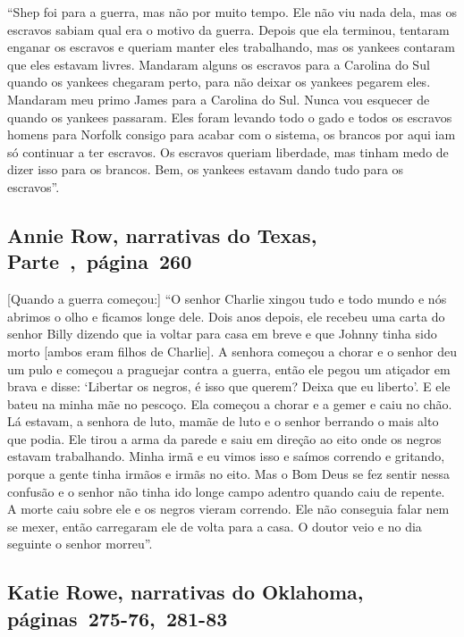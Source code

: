 ``Shep foi para a guerra, mas não por muito tempo. Ele não viu nada
dela, mas os escravos sabiam qual era o motivo da guerra. Depois que ela
terminou, tentaram enganar os escravos e queriam manter eles
trabalhando, mas os yankees contaram que eles estavam livres. Mandaram
alguns os escravos para a Carolina do Sul quando os yankees chegaram %
perto, para não deixar os yankees pegarem eles. Mandaram meu primo James
para a Carolina do Sul. Nunca vou esquecer de quando os yankees
passaram. Eles foram levando todo o gado e todos os escravos homens para
Norfolk consigo para acabar com o sistema, os brancos por aqui iam só
continuar a ter escravos. Os escravos queriam liberdade, mas tinham medo
de dizer isso para os brancos. Bem, os yankees estavam dando tudo para
os escravos''.

\subsection{Annie Row, narrativas do Texas, Parte~,~página~260}
\label{ref231}

{[}Quando a guerra começou:{]} ``O senhor Charlie xingou tudo e todo mundo e
nós abrimos o olho e ficamos longe dele. Dois anos depois, ele recebeu
uma carta do senhor Billy dizendo que ia voltar para casa em breve e que
Johnny tinha sido morto {[}ambos eram filhos de Charlie{]}. A senhora
começou a chorar e o senhor deu um pulo e começou a praguejar contra a
guerra, então ele pegou um atiçador em brava e disse: `Libertar os
negros, é isso que querem? Deixa que eu liberto'. E ele bateu na minha
mãe no pescoço. Ela começou a chorar e a gemer e caiu no chão. Lá
estavam, a senhora de luto, mamãe de luto e o senhor berrando o mais
alto que podia. Ele tirou a arma da parede e saiu em direção ao eito
onde os negros estavam trabalhando. Minha irmã e eu vimos isso e saímos
correndo e gritando, porque a gente tinha irmãos e irmãs no eito. Mas o
Bom Deus se fez sentir nessa confusão e o senhor não tinha ido longe
campo adentro quando caiu de repente. A morte caiu sobre ele e os negros
vieram correndo. Ele não conseguia falar nem se mexer, então carregaram
ele de volta para a casa. O doutor veio e no dia seguinte o senhor
morreu''.

\subsection{Katie Rowe, narrativas do Oklahoma, páginas~275-76,~281-83}
\label{ref232}

